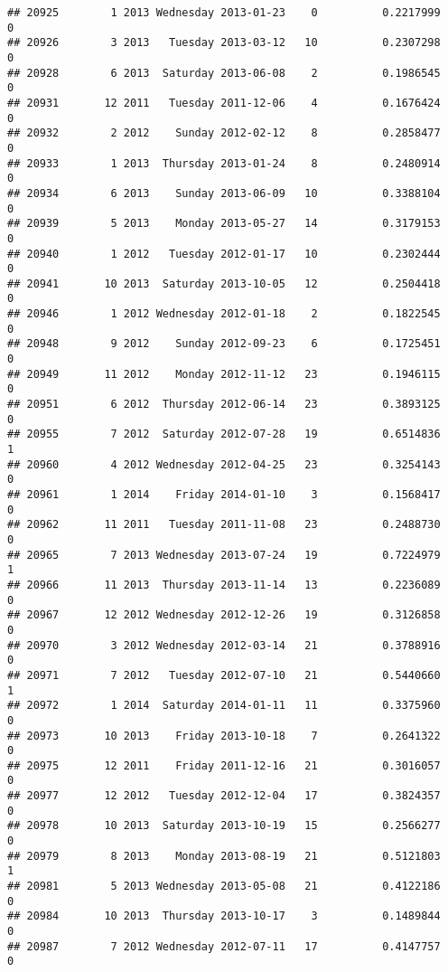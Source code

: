 \documentclass[
]{article}
\begin{document}
\begin{verbatim}
## 20925        1 2013 Wednesday 2013-01-23    0          0.2217999             0
## 20926        3 2013   Tuesday 2013-03-12   10          0.2307298             0
## 20928        6 2013  Saturday 2013-06-08    2          0.1986545             0
## 20931       12 2011   Tuesday 2011-12-06    4          0.1676424             0
## 20932        2 2012    Sunday 2012-02-12    8          0.2858477             0
## 20933        1 2013  Thursday 2013-01-24    8          0.2480914             0
## 20934        6 2013    Sunday 2013-06-09   10          0.3388104             0
## 20939        5 2013    Monday 2013-05-27   14          0.3179153             0
## 20940        1 2012   Tuesday 2012-01-17   10          0.2302444             0
## 20941       10 2013  Saturday 2013-10-05   12          0.2504418             0
## 20946        1 2012 Wednesday 2012-01-18    2          0.1822545             0
## 20948        9 2012    Sunday 2012-09-23    6          0.1725451             0
## 20949       11 2012    Monday 2012-11-12   23          0.1946115             0
## 20951        6 2012  Thursday 2012-06-14   23          0.3893125             0
## 20955        7 2012  Saturday 2012-07-28   19          0.6514836             1
## 20960        4 2012 Wednesday 2012-04-25   23          0.3254143             0
## 20961        1 2014    Friday 2014-01-10    3          0.1568417             0
## 20962       11 2011   Tuesday 2011-11-08   23          0.2488730             0
## 20965        7 2013 Wednesday 2013-07-24   19          0.7224979             1
## 20966       11 2013  Thursday 2013-11-14   13          0.2236089             0
## 20967       12 2012 Wednesday 2012-12-26   19          0.3126858             0
## 20970        3 2012 Wednesday 2012-03-14   21          0.3788916             0
## 20971        7 2012   Tuesday 2012-07-10   21          0.5440660             1
## 20972        1 2014  Saturday 2014-01-11   11          0.3375960             0
## 20973       10 2013    Friday 2013-10-18    7          0.2641322             0
## 20975       12 2011    Friday 2011-12-16   21          0.3016057             0
## 20977       12 2012   Tuesday 2012-12-04   17          0.3824357             0
## 20978       10 2013  Saturday 2013-10-19   15          0.2566277             0
## 20979        8 2013    Monday 2013-08-19   21          0.5121803             1
## 20981        5 2013 Wednesday 2013-05-08   21          0.4122186             0
## 20984       10 2013  Thursday 2013-10-17    3          0.1489844             0
## 20987        7 2012 Wednesday 2012-07-11   17          0.4147757             0

\end{verbatim}
\end{document}
